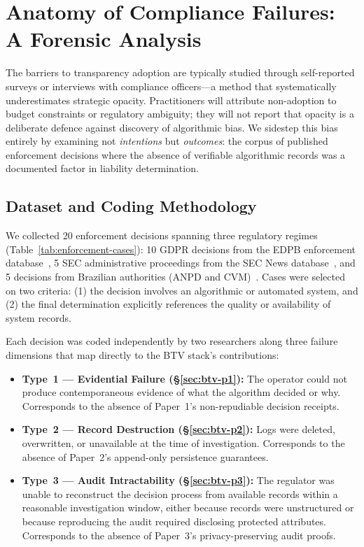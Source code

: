 \section{Anatomy of Compliance Failures: A Forensic Analysis}
\label{sec:forensic}

The barriers to transparency adoption are typically studied through
self-reported surveys or interviews with compliance officers---a method
that systematically underestimates strategic opacity. Practitioners will
attribute non-adoption to budget constraints or regulatory ambiguity;
they will not report that opacity is a deliberate defence against
discovery of algorithmic bias. We sidestep this bias entirely by
examining not \emph{intentions} but \emph{outcomes}: the corpus of
published enforcement decisions where the absence of verifiable
algorithmic records was a documented factor in liability determination.

\subsection{Dataset and Coding Methodology}
\label{subsec:dataset}

We collected 20 enforcement decisions spanning three regulatory regimes
(Table~\ref{tab:enforcement-cases}): 10 GDPR decisions from the EDPB
enforcement database~\cite{edpb-database}, 5 SEC administrative
proceedings from the SEC News database~\cite{sec-news}, and 5 decisions
from Brazilian authorities (ANPD and CVM)~\cite{anpd-decisions}. Cases
were selected on two criteria: (1) the decision involves an algorithmic
or automated system, and (2) the final determination explicitly
references the quality or availability of system records.

Each decision was coded independently by two researchers along three
failure dimensions that map directly to the BTV stack's contributions:

\begin{itemize}
  \item \textbf{Type~1 --- Evidential Failure (\S\ref{sec:btv-p1}):}
  The operator could not produce contemporaneous evidence of what the
  algorithm decided or why. Corresponds to the absence of Paper~1's
  non-repudiable decision receipts.

  \item \textbf{Type~2 --- Record Destruction (\S\ref{sec:btv-p2}):}
  Logs were deleted, overwritten, or unavailable at the time of
  investigation. Corresponds to the absence of Paper~2's append-only
  persistence guarantees.

  \item \textbf{Type~3 --- Audit Intractability (\S\ref{sec:btv-p3}):}
  The regulator was unable to reconstruct the decision process from
  available records within a reasonable investigation window, either
  because records were unstructured or because reproducing the audit
  required disclosing protected attributes. Corresponds to the absence
  of Paper~3's privacy-preserving audit proofs.
\end{itemize}

